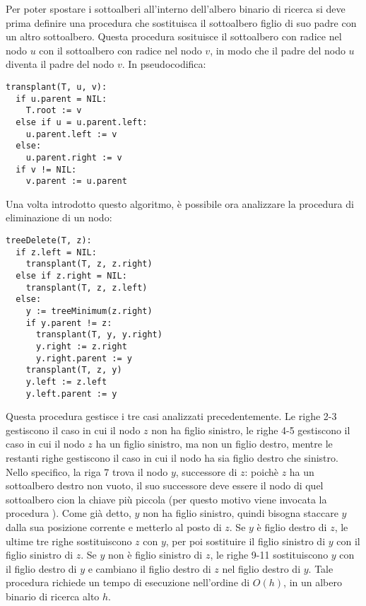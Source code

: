 Per poter spostare i sottoalberi all'interno dell'albero binario di ricerca si deve prima definire una procedura che sostituisca il sottoalbero figlio di suo padre con un altro sottoalbero. Questa procedura sosituisce il sottoalbero con radice nel nodo \(u\) con il sottoalbero con radice nel nodo \(v\), in modo che il padre del nodo \(u\) diventa il padre del nodo \(v\). In pseudocodifica:

\begin{lstlisting}
transplant(T, u, v):
  if u.parent = NIL:
    T.root := v
  else if u = u.parent.left:
    u.parent.left := v
  else:
    u.parent.right := v
  if v != NIL:
    v.parent := u.parent 
\end{lstlisting}

Una volta introdotto questo algoritmo, è possibile ora analizzare la procedura di eliminazione di un nodo:

\begin{lstlisting}
treeDelete(T, z):
  if z.left = NIL:
    transplant(T, z, z.right)
  else if z.right = NIL:
    transplant(T, z, z.left)
  else:
    y := treeMinimum(z.right)
    if y.parent != z:
      transplant(T, y, y.right)
      y.right := z.right
      y.right.parent := y
    transplant(T, z, y)
    y.left := z.left
    y.left.parent := y
\end{lstlisting}

Questa procedura gestisce i tre casi analizzati precedentemente. Le righe 2-3 gestiscono il caso in cui il nodo \(z\) non ha figlio sinistro, le righe 4-5 gestiscono il caso in cui il nodo \(z\) ha un figlio sinistro, ma non un figlio destro, mentre le restanti righe gestiscono il caso in cui il nodo ha sia figlio destro che sinistro. Nello specifico, la riga 7 trova il nodo \(y\), successore di \(z\): poichè \(z\) ha un sottoalbero destro non vuoto, il suo successore deve essere il nodo di quel sottoalbero cion la chiave più piccola (per questo motivo viene invocata la procedura ). Come già detto, \(y\) non ha figlio sinistro, quindi bisogna staccare \(y\) dalla sua posizione corrente e metterlo al posto di \(z\). Se \(y\) è figlio destro di \(z\), le ultime tre righe sostituiscono \(z\) con \(y\), per poi sostituire il figlio sinistro di \(y\) con il figlio sinistro di \(z\). Se \(y\) non è figlio sinistro di \(z\), le righe 9-11 sostituiscono \(y\) con il figlio destro di \(y\) e cambiano il figlio destro di \(z\) nel figlio destro di \(y\). Tale procedura richiede un tempo di esecuzione nell'ordine di \(O(h)\), in un albero binario di ricerca alto \(h\).




